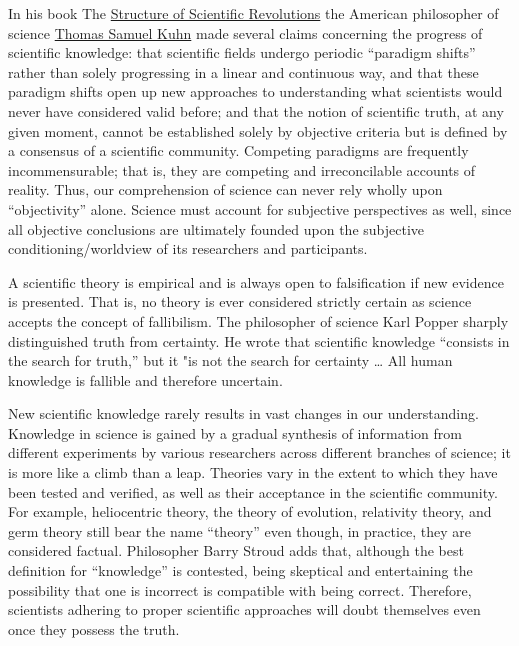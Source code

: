 \documentclass[
]{article}
\begin{document}
In his book The
\href{https://en.wikipedia.org/wiki/The_Structure_of_Scientific_Revolutions}{Structure
of Scientific Revolutions} the American philosopher of science
\href{https://en.wikipedia.org/wiki/Thomas_Kuhn}{Thomas Samuel Kuhn}
made several claims concerning the progress of scientific knowledge:
that scientific fields undergo periodic ``paradigm shifts'' rather than
solely progressing in a linear and continuous way, and that these
paradigm shifts open up new approaches to understanding what scientists
would never have considered valid before; and that the notion of
scientific truth, at any given moment, cannot be established solely by
objective criteria but is defined by a consensus of a scientific
community. Competing paradigms are frequently incommensurable; that is,
they are competing and irreconcilable accounts of reality. Thus, our
comprehension of science can never rely wholly upon ``objectivity''
alone. Science must account for subjective perspectives as well, since
all objective conclusions are ultimately founded upon the subjective
conditioning/worldview of its researchers and participants.

A scientific theory is empirical and is always open to falsification if
new evidence is presented. That is, no theory is ever considered
strictly certain as science accepts the concept of fallibilism. The
philosopher of science Karl Popper sharply distinguished truth from
certainty. He wrote that scientific knowledge ``consists in the search
for truth,'' but it "is not the search for certainty \ldots{} All human
knowledge is fallible and therefore uncertain.

New scientific knowledge rarely results in vast changes in our
understanding. Knowledge in science is gained by a gradual synthesis of
information from different experiments by various researchers across
different branches of science; it is more like a climb than a leap.
Theories vary in the extent to which they have been tested and verified,
as well as their acceptance in the scientific community. For example,
heliocentric theory, the theory of evolution, relativity theory, and
germ theory still bear the name ``theory'' even though, in practice,
they are considered factual. Philosopher Barry Stroud adds that,
although the best definition for ``knowledge'' is contested, being
skeptical and entertaining the possibility that one is incorrect is
compatible with being correct. Therefore, scientists adhering to proper
scientific approaches will doubt themselves even once they possess the
truth.
\end{document}
